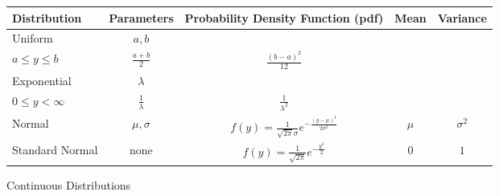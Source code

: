 \documentclass[12pt]{article}
\begin{document}
\vspace{2cm}

\begin{figure}[H]
\caption{Continuous Distributions}
\begin{tabular}{l c c c c}
\hline
Distribution & Parameters & Probability Density Function (pdf) & Mean & Variance \\
\hline
Uniform & $a, b$ & \makecell{ $\displaystyle f(y) = \frac{1}{b-a}$ \\ $a \leq y \leq b$ }& $\displaystyle \frac{a + b}{2}$ & $\displaystyle \frac{(b - a)^2}{12}$ \\
Exponential & $\lambda$ & \makecell{ $\displaystyle f(y) = \lambda e^{-\lambda y}$ \\ $0 \leq y < \infty$} & $\displaystyle \frac{1}{\lambda}$ & $\displaystyle \frac{1}{\lambda^2}$ \\
Normal & $\mu, \sigma$ & $\displaystyle f(y) = \frac{1}{\sqrt{2 \pi}\sigma}e^{- \frac{(y - \mu)^2}{2 \sigma^2}}$ & $\mu$ & $\sigma^2$ \\
Standard Normal & none & $\displaystyle f(y) = \frac{1}{\sqrt{2 \pi}}e^{- \frac{y^2}{2}}$ & $0$ & $1$ \\
\end{tabular}
\end{figure}
\end{document}
